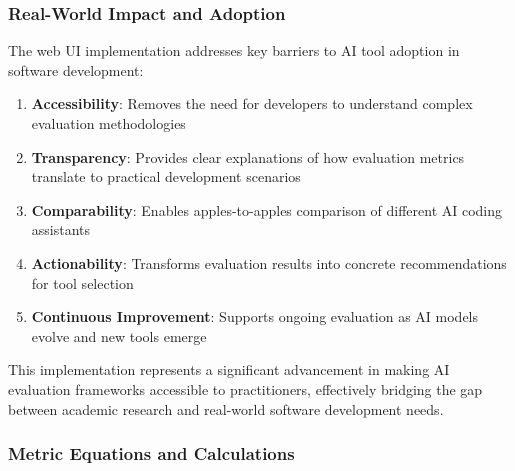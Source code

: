 \documentclass[conference]{IEEEtran}
\begin{document}


\subsubsection{Real-World Impact and Adoption}

The web UI implementation addresses key barriers to AI tool adoption in software development:

\begin{enumerate}
    \item \textbf{Accessibility}: Removes the need for developers to understand complex evaluation methodologies
    \item \textbf{Transparency}: Provides clear explanations of how evaluation metrics translate to practical development scenarios
    \item \textbf{Comparability}: Enables apples-to-apples comparison of different AI coding assistants
    \item \textbf{Actionability}: Transforms evaluation results into concrete recommendations for tool selection
    \item \textbf{Continuous Improvement}: Supports ongoing evaluation as AI models evolve and new tools emerge
\end{enumerate}

This implementation represents a significant advancement in making AI evaluation frameworks accessible to practitioners, effectively bridging the gap between academic research and real-world software development needs.

\subsubsection{Metric Equations and Calculations}
\end{document}
